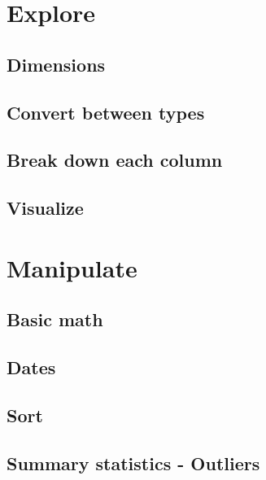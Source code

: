 \documentclass[
]{book}
\begin{document}
\hypertarget{explore}{%
\chapter{Explore}\label{explore}}

\hypertarget{dimensions}{%
\section{Dimensions}\label{dimensions}}

\hypertarget{convert-between-types}{%
\section{Convert between types}\label{convert-between-types}}

\hypertarget{break-down-each-column}{%
\section{Break down each column}\label{break-down-each-column}}

\hypertarget{visualize}{%
\section{Visualize}\label{visualize}}

\hypertarget{manipulate}{%
\chapter{Manipulate}\label{manipulate}}

\hypertarget{basic-math}{%
\section{Basic math}\label{basic-math}}

\hypertarget{dates}{%
\section{Dates}\label{dates}}

\hypertarget{sort}{%
\section{Sort}\label{sort}}

\hypertarget{summary-statistics---outliers}{%
\section{Summary statistics - Outliers}\label{summary-statistics---outliers}}
\end{document}

